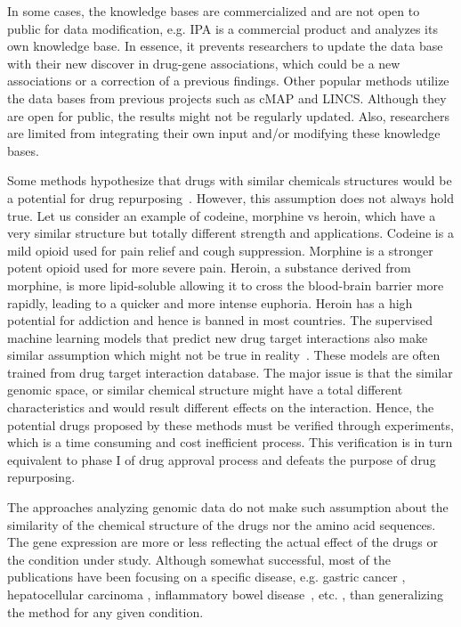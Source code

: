 In some cases, the knowledge bases are commercialized and are not open to public for data modification, e.g. IPA is a commercial product and analyzes its own knowledge base. In essence, it prevents researchers to update the data base with their new discover in drug-gene associations, which could be a new associations or a correction of a previous findings. 
Other popular methods utilize the data bases from previous projects such as cMAP and LINCS. Although they are open for public, the results might not be regularly updated. Also, researchers are limited from integrating their own input and/or modifying these knowledge bases. 

Some methods hypothesize that drugs with similar chemicals structures would be a potential for drug repurposing~\cite{bleakley2009supervised, li2012new, tan2014drug}. However, this assumption does not always hold true. Let us consider an example of codeine, morphine vs heroin, which have a very similar structure but totally different strength and applications. Codeine is a mild opioid used for pain relief and cough suppression. Morphine is a stronger potent opioid used for more severe pain. Heroin, a substance derived from morphine, is more lipid-soluble allowing it to cross the blood-brain barrier more rapidly, leading to a quicker and more intense euphoria. Heroin has a high potential for addiction and hence is banned in most countries. 
The supervised machine learning models that predict new drug target interactions also make similar assumption which might not be true in reality~\cite{zheng2015large, susnow2003use, shen2003development, duvenaud2015convolutional, salt1992use}. These models are often trained from drug target interaction database. The major issue is that the similar genomic space, or similar chemical structure might have a total different characteristics and would result different effects on the interaction.
Hence, the potential drugs  proposed by these methods  must be verified through experiments, which is a time consuming and cost inefficient process. This verification is in turn equivalent to phase I of drug approval process and defeats the purpose of drug repurposing.

The approaches analyzing genomic data do not make such assumption about the similarity of the chemical structure of the drugs nor the amino acid sequences. The gene expression are more or less reflecting the actual effect of the drugs or the condition under study.
Although somewhat successful, most of the publications have been focusing on a specific disease, e.g. gastric cancer \cite{claerhout2011gene}, hepatocellular carcinoma \cite{chen2011gene},  inflammatory bowel disease~\cite{dudley2011computational}, etc. , than generalizing the method for any given condition.


